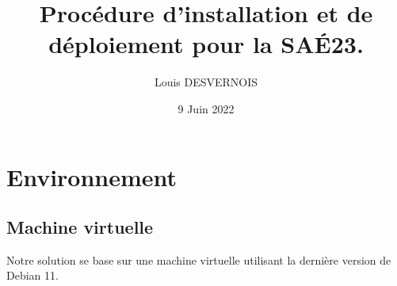 \documentclass{article}
\author{Louis DESVERNOIS}
\title{Procédure d'installation et de déploiement pour la SAÉ23.}
\date{9 Juin 2022}
\begin{document}
    \maketitle
    \tableofcontents
    \listoffigures
    \newpage
    \section{Environnement}
        \subsection{Machine virtuelle}
            Notre solution se base sur une machine virtuelle utilisant la dernière version de Debian 11.
\end{document}
